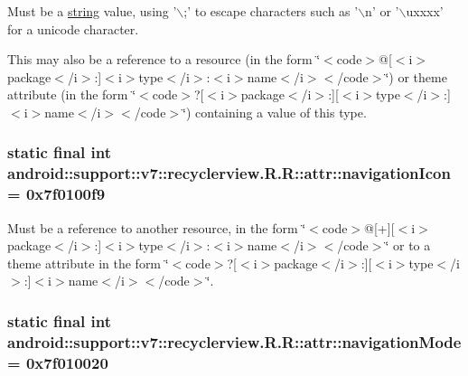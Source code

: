 Must be a \hyperlink{classandroid_1_1support_1_1v7_1_1recyclerview_1_1_r_1_1string}{string} value, using '$\backslash$;' to escape characters such as '$\backslash$n' or '$\backslash$uxxxx' for a unicode character. 

This may also be a reference to a resource (in the form \char`\"{}$<$code$>$@\mbox{[}$<$i$>$package$<$/i$>$:\mbox{]}$<$i$>$type$<$/i$>$:$<$i$>$name$<$/i$>$$<$/code$>$\char`\"{}) or theme attribute (in the form \char`\"{}$<$code$>$?\mbox{[}$<$i$>$package$<$/i$>$:\mbox{]}\mbox{[}$<$i$>$type$<$/i$>$:\mbox{]}$<$i$>$name$<$/i$>$$<$/code$>$\char`\"{}) containing a value of this type. \hypertarget{classandroid_1_1support_1_1v7_1_1recyclerview_1_1_r_1_1attr_299d3d5f34c3cd2f1dcbc221748bf884}{
\subsubsection[{navigationIcon}]{\setlength{\rightskip}{0pt plus 5cm}static final int android::support::v7::recyclerview.R.R::attr::navigationIcon = 0x7f0100f9}}
\label{classandroid_1_1support_1_1v7_1_1recyclerview_1_1_r_1_1attr_299d3d5f34c3cd2f1dcbc221748bf884}


Must be a reference to another resource, in the form \char`\"{}$<$code$>$@\mbox{[}+\mbox{]}\mbox{[}$<$i$>$package$<$/i$>$:\mbox{]}$<$i$>$type$<$/i$>$:$<$i$>$name$<$/i$>$$<$/code$>$\char`\"{} or to a theme attribute in the form \char`\"{}$<$code$>$?\mbox{[}$<$i$>$package$<$/i$>$:\mbox{]}\mbox{[}$<$i$>$type$<$/i$>$:\mbox{]}$<$i$>$name$<$/i$>$$<$/code$>$\char`\"{}. \hypertarget{classandroid_1_1support_1_1v7_1_1recyclerview_1_1_r_1_1attr_71fe4f9612123028a43b2b63beba72ce}{
\subsubsection[{navigationMode}]{\setlength{\rightskip}{0pt plus 5cm}static final int android::support::v7::recyclerview.R.R::attr::navigationMode = 0x7f010020}}
\label{classandroid_1_1support_1_1v7_1_1recyclerview_1_1_r_1_1attr_71fe4f9612123028a43b2b63beba72ce}



